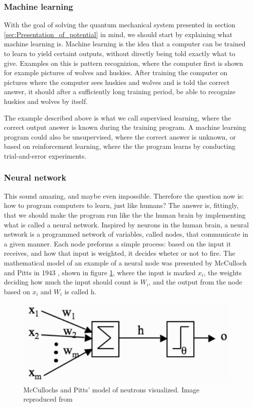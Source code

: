 \documentclass[norsk,a4paper,12pt]{article}
\begin{document}
\subsubsection{Machine learning}
With the goal of solving the quantum mechanical system presented in section \ref{sec:Presentation_of_potential} in mind, we should start by explaining what machine learning is. Machine learning is the idea that a computer can be trained to learn to yield certaint outputs, without directly being told exactly what to give. Examples on this is pattern recognizion, where the computer first is shown for example pictures of wolves and huskies. After training the computer on pictures where the computer sees huskies and wolves and is told the correct answer, it should after a sufficiently long training period, be able to recognize huskies and wolves by itself. 
\par 
\vspace{3mm}
The example described above is what we call supervised learning, where the correct output answer is known during the training program. A machine learning program could also be unsupervised, where the correct answer is unknown, or based on reinforcement learning, where the the program learns by conducting trial-and-error experiments. 
\par 
\vspace{3mm}

\subsubsection{Neural network}
This sound amazing, and maybe even impossible. Therefore the question now is: how to program computers to learn, just like humans? The answer is, fittingly, that we should make the program run like the the human brain by implementing what is called a neural network. Inspired by neurons in the human brain, a neural network is a programmed network of variables, called nodes, that communicate in a given manner. Each node preforms a simple process: based on the input it receives, and how that input is weighted, it decides wheter or not to fire. The mathematical model of an example of a neural node was presented by McCulloch and Pitts in 1943 \cite{Marsland}, shown in figure \ref{fig:neuron}, where the input is marked $x_i$, the weights deciding how much the input should count is $W_i$, and the output from the node based on $x_i$ and $W_i$ is called h. 

 \begin{figure} [H]
 	\centering
 	\includegraphics[scale=0.6]{plots/neuron.png}
 	\caption{McCullochs and Pitts' model of neutrons visualized. Image reproduced from \cite{Marsland} }
 	\label{fig:neuron}
 \end{figure}
\end{document}
